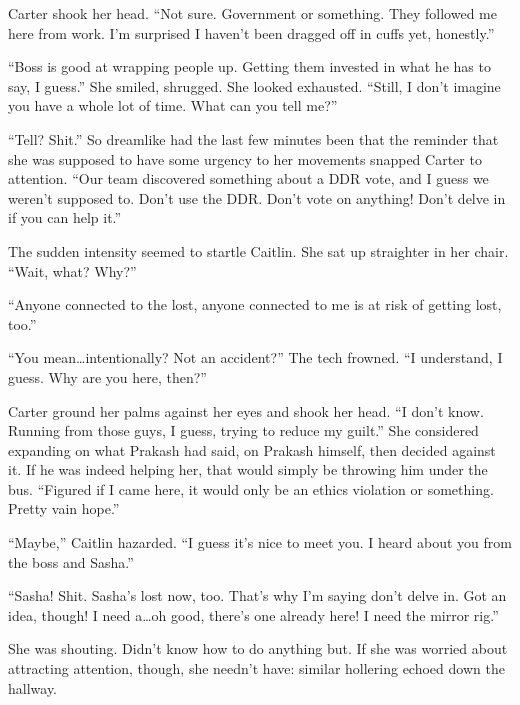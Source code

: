 Carter shook her head. ``Not sure. Government or something. They followed me here from work. I'm surprised I haven't been dragged off in cuffs yet, honestly.''

``Boss is good at wrapping people up. Getting them invested in what he has to say, I guess.'' She smiled, shrugged. She looked exhausted. ``Still, I don't imagine you have a whole lot of time. What can you tell me?''

``Tell? Shit.'' So dreamlike had the last few minutes been that the reminder that she was supposed to have some urgency to her movements snapped Carter to attention. ``Our team discovered something about a DDR vote, and I guess we weren't supposed to. Don't use the DDR. Don't vote on anything! Don't delve in if you can help it.''

The sudden intensity seemed to startle Caitlin. She sat up straighter in her chair. ``Wait, what? Why?''

``Anyone connected to the lost, anyone connected to me is at risk of getting lost, too.''

``You mean\ldots{}intentionally? Not an accident?'' The tech frowned. ``I understand, I guess. Why are you here, then?''

Carter ground her palms against her eyes and shook her head. ``I don't know. Running from those guys, I guess, trying to reduce my guilt.'' She considered expanding on what Prakash had said, on Prakash himself, then decided against it. If he was indeed helping her, that would simply be throwing him under the bus. ``Figured if I came here, it would only be an ethics violation or something. Pretty vain hope.''

``Maybe,'' Caitlin hazarded. ``I guess it's nice to meet you. I heard about you from the boss and Sasha.''

``Sasha! Shit. Sasha's lost now, too. That's why I'm saying don't delve in. Got an idea, though! I need a\ldots{}oh good, there's one already here! I need the mirror rig.''

She was shouting. Didn't know how to do anything but. If she was worried about attracting attention, though, she needn't have: similar hollering echoed down the hallway.

